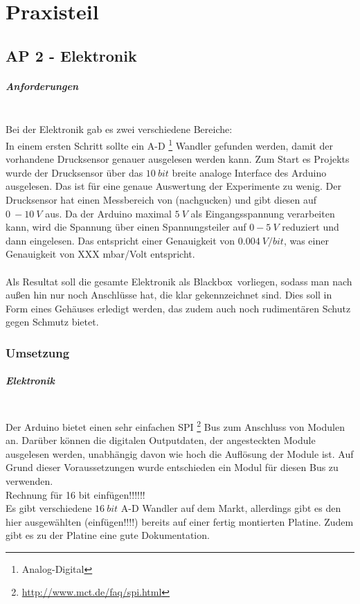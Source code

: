 \chapter{Praxisteil}

\section{AP 2 - Elektronik}

\paragraph{Anforderungen}
\hfill \\
Bei der Elektronik gab es zwei verschiedene Bereiche: \\
In einem ersten Schritt sollte ein A-D \footnote{Analog-Digital} Wandler gefunden werden, damit der vorhandene Drucksensor genauer ausgelesen werden kann. Zum Start es Projekts wurde der Drucksensor über das $\SI{10}{bit}$ breite analoge Interface des Arduino ausgelesen. Das ist für eine genaue Auswertung der Experimente zu wenig. Der Drucksensor hat einen Messbereich von (nachgucken) und gibt diesen auf $\SI{0}{} - \SI{10}{V}$ aus. Da der Arduino maximal $\SI{5}{V}$ als Eingangsspannung verarbeiten kann, wird die Spannung über einen Spannungsteiler auf $\SI{0} - \SI{5}{V}$ reduziert und dann eingelesen. Das entspricht einer Genauigkeit von $\SI{0,004}{V/bit}$, was einer Genauigkeit von XXX mbar/Volt entspricht. \\
\hfill \\
Als Resultat soll die gesamte Elektronik als \glqq Blackbox\grqq \ vorliegen, sodass man nach außen hin nur noch Anschlüsse hat, die klar gekennzeichnet sind. Dies soll in Form eines Gehäuses erledigt werden, das zudem auch noch rudimentären Schutz gegen Schmutz bietet.


\subsection{Umsetzung}

\paragraph{Elektronik}
\hfill \\
Der Arduino bietet einen sehr einfachen SPI \footnote{\url{http://www.mct.de/faq/spi.html}} Bus zum Anschluss von Modulen an. Darüber können die digitalen Outputdaten, der angesteckten Module ausgelesen werden, unabhängig davon wie hoch die Auflösung der Module ist. Auf Grund dieser Voraussetzungen wurde entschieden ein Modul für diesen Bus zu verwenden. \\
Rechnung für 16 bit einfügen!!!!!! \\
Es gibt verschiedene $\SI{16}{bit}$ A-D Wandler auf dem Markt, allerdings gibt es den hier ausgewählten (einfügen!!!!) bereits auf einer fertig montierten Platine. Zudem gibt es zu der Platine eine gute Dokumentation. 


